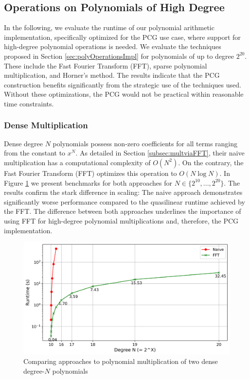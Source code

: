 \subsection{Operations on Polynomials of High Degree}
\label{subsec:evalOpOnHighDegreePoly}
In the following, we evaluate the runtime of our polynomial arithmetic implementation, specifically optimized for the PCG use case, where support for high-degree polynomial operations is needed. We evaluate the techniques proposed in Section \ref{sec:polyOperationsImpl} for polynomials of up to degree $2^{20}$. These include the Fast Fourier Transform (FFT), sparse polynomial multiplication, and Horner's method. The results indicate that the PCG construction benefits significantly from the strategic use of the techniques used. Without these optimizations, the PCG would not be practical within reasonable time constraints.

\subsubsection{Dense Multiplication}
Dense degree $N$ polynomials possess non-zero coefficients for all terms ranging from the constant to $x^N$. As detailed in Section \ref{subsec:multviaFFT}, their naive multiplication has a computational complexity of $O(N^2)$. On the contrary, the Fast Fourier Transform (FFT) optimizes this operation to $O(N \log N)$. In Figure \ref{fig:polyMultNaiveVsFFT} we present benchmarks for both approaches for $N\in \{2^{10}, ..., 2^{20}\}$. The results confirm the stark difference in scaling: The naive approach demonstrates significantly worse performance compared to the quasilinear runtime achieved by the FFT. The difference between both approaches underlines the importance of using FFT for high-degree polynomial multiplications and, therefore, the PCG implementation.

\begin{figure}[t]
    \centering
    \includegraphics[scale=0.49]{images/plots/poly_mult.png}
    \caption{Comparing approaches to polynomial multiplication of two dense degree-$N$ polynomials}
    \label{fig:polyMultNaiveVsFFT}
\end{figure}

